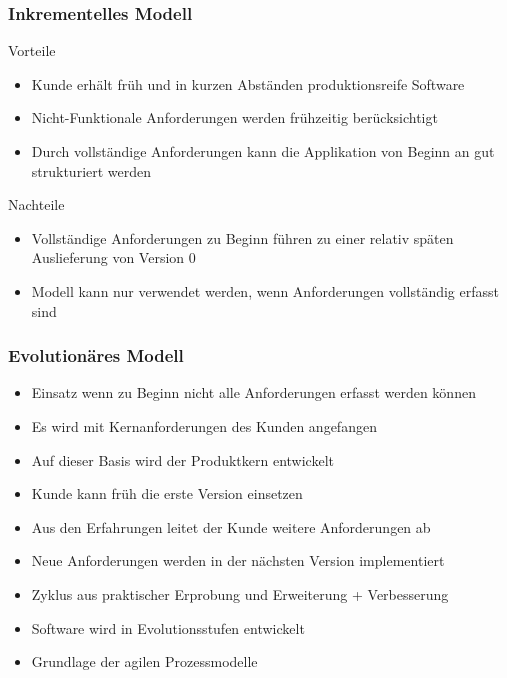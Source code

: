 \begin{frame}
\frametitle{Inkrementelles Modell}
	Vorteile
	\begin{itemize}
		\item Kunde erhält früh und in kurzen Abständen produktionsreife Software
		\item Nicht-Funktionale Anforderungen werden frühzeitig berücksichtigt
		\item Durch vollständige Anforderungen kann die Applikation von 
		Beginn an gut strukturiert werden
	\end{itemize}
	\bigskip
	Nachteile
	\begin{itemize}
		\item Vollständige Anforderungen zu Beginn führen zu einer relativ späten 
		Auslieferung von Version 0
		\item Modell kann nur verwendet werden, wenn Anforderungen vollständig erfasst
		sind	
	\end{itemize}
\end{frame}

\begin{frame}
\frametitle{Evolutionäres Modell}
	\begin{itemize}
		\item Einsatz wenn zu Beginn nicht alle Anforderungen erfasst werden können
		\item Es wird mit Kernanforderungen des Kunden angefangen
		\item Auf dieser Basis wird der Produktkern entwickelt
		\item Kunde kann früh die erste Version einsetzen
		\item Aus den Erfahrungen leitet der Kunde weitere Anforderungen ab
		\item Neue Anforderungen werden in der nächsten Version implementiert
		\item Zyklus aus praktischer Erprobung und Erweiterung + Verbesserung
		\item Software wird in Evolutionsstufen entwickelt
		\item Grundlage der agilen Prozessmodelle
	\end{itemize}
\end{frame}

